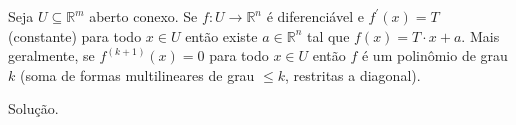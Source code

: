 \begin{homeworkProblem}
  Seja $U\subseteq \mathbb{R}^{m}$ aberto conexo. Se $f:U\to\mathbb{R}^{n}$ é diferenciável e $f^{\prime}(x)=T$ (constante) para todo $x\in U$ então existe $a\in\mathbb{R}^{n}$ tal que $f(x)=T\cdot x+a$. Mais geralmente, se $f^{(k+1)}(x)=0$ para todo $x\in U$ então $f$ é um polinômio de grau $k$ (soma de formas multilineares de grau $\leq k$, restritas a diagonal). 
  \begin{solution}
    Solução.
  \end{solution}
\end{homeworkProblem}
